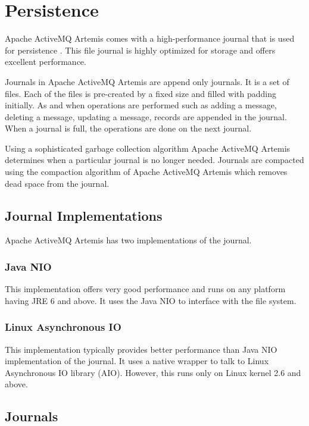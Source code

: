 \section{Persistence}

Apache ActiveMQ Artemis comes with a high-performance journal that is used for persistence \parencite{artemis_persistence}. This file journal is highly optimized for storage and offers excellent performance.

Journals in Apache ActiveMQ Artemis are append only journals. It is a set of files. Each of the files is pre-created by a fixed size and filled with padding initially. As and when operations are performed such as adding a message, deleting a message, updating a message, records are appended in the journal. When a journal is full, the operations are done on the next journal.

Using a sophisticated garbage collection algorithm Apache ActiveMQ Artemis determines when a particular journal is no longer needed. Journals are compacted using the compaction algorithm of Apache ActiveMQ Artemis which removes dead space from the journal.

\subsection{Journal Implementations}

Apache ActiveMQ Artemis has two implementations of the journal.

\subsubsection{Java NIO}

This implementation offers very good performance and runs on any platform having JRE 6 and above. It uses the Java NIO to interface with the file system.

\subsubsection{Linux Asynchronous IO}

This implementation typically provides better performance than Java NIO implementation of the journal. It uses a native wrapper to talk to Linux Asynchronous IO library (AIO). However, this runs only on Linux kernel 2.6 and above. 

\subsection{Journals}

